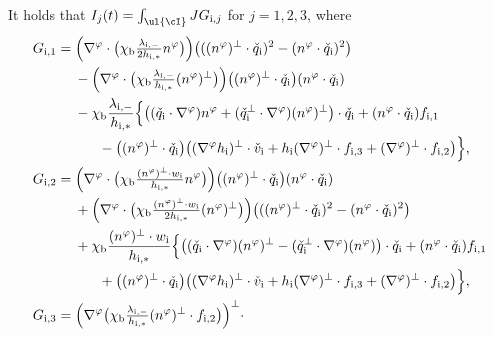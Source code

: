 \begin{lemma}\label{lem:Rellich2}
It holds that $I_j(t)=\int_{\ul{\cI}}JG_{{\rm i},j}$ for $j=1,2,3$, where
\begin{align*}
G_{{\rm i},1}
&= \Bigl(\nabla^\varphi\cdot\bigl(\chi_\mathrm{b}\tfrac{\lambda_{{\rm i},-}}{2h_{{\rm i},*}}n^\varphi \bigr) \Bigr)
\bigl(((n^\varphi)^\perp\cdot\check{q}_\mathrm{i})^2 - (n^\varphi\cdot\check{q}_\mathrm{i})^2\bigr) \\
&\quad\;
- \Bigl(\nabla^\varphi\cdot\bigl(\chi_\mathrm{b}\tfrac{\lambda_{{\rm i},-}}{h_{{\rm i},*}}(n^\varphi)^\perp \bigr) \Bigr)
\bigl((n^\varphi)^\perp\cdot\check{q}_\mathrm{i}\bigr)(n^\varphi\cdot\check{q}_\mathrm{i}) \\
&\quad\;
- \chi_\mathrm{b}\frac{\lambda_{{\rm i},-}}{h_{{\rm i},*}}\Bigl\{
\bigl((\check{q}_\mathrm{i}\cdot\nabla^\varphi)n^\varphi + (\check{q}_\mathrm{i}^\perp\cdot\nabla^\varphi)(n^\varphi)^\perp \bigr)\cdot\check{q}_\mathrm{i}
+ (n^\varphi\cdot\check{q}_\mathrm{i})f_{{\rm i},1} \\
&\makebox[3em]{}
- \bigl((n^\varphi)^\perp\cdot\check{q}_\mathrm{i}\bigr)\bigl((\nabla^\varphi h_\mathrm{i})^\perp\cdot\check{v}_\mathrm{i} + h_\mathrm{i}(\nabla^\varphi)^\perp\cdot f_{{\rm i},3}
+ (\nabla^\varphi)^\perp\cdot f_{{\rm i},2}\bigr) \Bigr\}, \\
G_{{\rm i},2}
&= \Bigl(\nabla^\varphi\cdot\bigl(\chi_\mathrm{b}\tfrac{(n^\varphi)^\perp\cdot w_\mathrm{i}}{h_{{\rm i},*}}n^\varphi \bigr) \Bigr)
\bigl((n^\varphi)^\perp\cdot\check{q}_\mathrm{i}\bigr)(n^\varphi\cdot\check{q}_\mathrm{i}) \\
&\quad\;
+ \Bigl(\nabla^\varphi\cdot\bigl(\chi_\mathrm{b}\tfrac{(n^\varphi)^\perp\cdot w_\mathrm{i}}{2h_{{\rm i},*}}(n^\varphi)^\perp \bigr) \Bigr)
\bigl(((n^\varphi)^\perp\cdot\check{q}_\mathrm{i})^2 - (n^\varphi\cdot\check{q}_\mathrm{i})^2\bigr) \\
&\quad\;
+ \chi_\mathrm{b}\frac{(n^\varphi)^\perp\cdot w_\mathrm{i}}{h_{{\rm i},*}}\Bigl\{
\bigl((\check{q}_\mathrm{i}\cdot\nabla^\varphi)(n^\varphi)^\perp - (\check{q}_\mathrm{i}^\perp\cdot\nabla^\varphi)(n^\varphi) \bigr)\cdot\check{q}_\mathrm{i}
+ (n^\varphi\cdot\check{q}_\mathrm{i})f_{{\rm i},1} \\
&\makebox[3em]{}
+ \bigl((n^\varphi)^\perp\cdot\check{q}_\mathrm{i}\bigr)\bigl((\nabla^\varphi h_\mathrm{i})^\perp\cdot\check{v}_\mathrm{i} + h_\mathrm{i}(\nabla^\varphi)^\perp\cdot f_{{\rm i},3}
+ (\nabla^\varphi)^\perp\cdot f_{{\rm i},2}\bigl) \Bigr\}, \\
G_{{\rm i},3}
&= \Bigl(\nabla^\varphi\bigl(\chi_\mathrm{b}\tfrac{\lambda_{{\rm i},-}}{h_{{\rm i},*}}(n^\varphi)^\perp\cdot f_{{\rm i},2} \bigr) \Bigr)^\perp\cdot

\end{align*}
\end{lemma}
